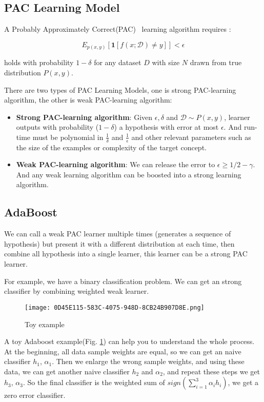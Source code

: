 \documentclass[11pt]{article}
\begin{document}
\subsection{PAC Learning Model}

A Probably Approximately Correct(PAC)~\cite{valiant1984theory} learning algorithm requires :

\begin{equation}
E_{p(x, y)}[\mathbf{1}[f(x ; \mathcal{D}) \neq y]]<\epsilon
\end{equation}

holds with probability $1-\delta $ for any dataset $D$ with size $N$ drawn from true distribution $P(x,y)$.

There are two types of PAC Learning Models, one is strong PAC-learning algorithm, the other is weak PAC-learning algorithm:
\begin{itemize}
    \item \textbf{Strong PAC-learning algorithm}: Given $\epsilon, \delta$ and $\mathcal{D} \sim P(x, y)$,
learner outputs with probability ($1-\delta$) a hypothesis with error at most $\epsilon$. And run-time must be polynomial in $\frac{1}{\delta}$ and $\frac{1}{\epsilon}$  and other relevant parameters such as the size of the examples or complexity of the target concept.
    \item \textbf{Weak PAC-learning algorithm}: We can release the error to $\epsilon \geq 1 / 2-\gamma$. And any weak learning algorithm can be boosted into a strong learning algorithm.
\end{itemize}


\subsection{AdaBoost}

We can call a weak PAC learner multiple times (generates a sequence of hypothesis) but present
it with a different distribution at each time, then combine all hypothesis into a single learner, this learner can be a strong PAC learner. 

For example, we have a binary classification problem. We can get an strong classifier by combining weighted weak learner.
\begin{figure}[htbp]
    \centering
\texttt{[image: 0D45E115-583C-4075-948D-8CB24B907D8E.png]}
    \caption{Toy example}
    \label{fig:galaxy}
\end{figure} 


A toy Adaboost example(Fig. \ref{fig:galaxy}) can help you to understand the whole process. At the beginning, all data sample weights are equal, so we can get an naive classifier $h_1$, $\alpha_1$. Then we enlarge the wrong sample weights, and using these data, we can get another naive classifier $h_2$ and $\alpha_2$, and repeat these steps we get $h_3$, $\alpha_3$. So the final classifier is the weighted sum of $sign(\sum_{i=1}^3\alpha_ih_i)$, we get a zero error classifier.
\end{document}
